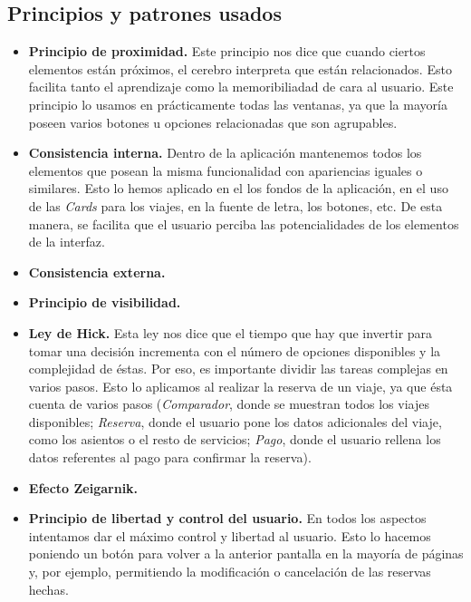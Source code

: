 \subsection{Principios y patrones usados}

\begin{itemize}

      \item \textbf{Principio de proximidad.} Este principio nos dice que cuando ciertos elementos están próximos, el cerebro interpreta
            que están relacionados. Esto facilita tanto el aprendizaje como la memoribiliadad de cara al usuario. Este principio lo usamos en prácticamente
            todas las ventanas, ya que la mayoría poseen varios botones u opciones relacionadas que son agrupables.
      \item \textbf{Consistencia interna.} Dentro de la aplicación mantenemos todos los elementos que posean la misma funcionalidad con apariencias iguales
            o similares. Esto lo hemos aplicado en el los fondos de la aplicación, en el uso de las \textit{Cards} para los viajes, en la fuente de letra, los
            botones, etc. De esta manera, se facilita que el usuario perciba las potencialidades de los elementos de la interfaz.
      \item \textbf{Consistencia externa.} 
      \item \textbf{Principio de visibilidad.}
      \item \textbf{Ley de Hick.} Esta ley nos dice que el tiempo que hay que invertir para tomar una decisión incrementa con el número de opciones disponibles y la complejidad
            de éstas. Por eso, es importante dividir las tareas complejas en varios pasos. Esto lo aplicamos al realizar la reserva de un viaje, ya que ésta cuenta de varios
            pasos (\textit{Comparador}, donde se muestran todos los viajes disponibles; \textit{Reserva}, donde el usuario pone los datos adicionales del viaje, como los asientos
            o el resto de servicios; \textit{Pago}, donde el usuario rellena los datos referentes al pago para confirmar la reserva).
      \item \textbf{Efecto Zeigarnik.}
      \item \textbf{Principio de libertad y control del usuario.} En todos los aspectos intentamos dar el máximo control y libertad al usuario. Esto lo hacemos poniendo un botón para volver a la anterior
            pantalla en la mayoría de páginas y, por ejemplo, permitiendo la modificación o cancelación de las reservas hechas.

\end{itemize}
